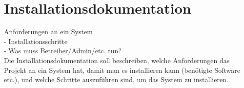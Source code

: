 
\chapter{Installationsdokumentation}

Anforderungen an ein System\\
- Installationsschritte\\
- Was muss Betreiber/Admin/etc. tun?\\

Die Installationsdokumentation soll beschreiben, welche Anforderungen das Projekt an ein System hat, damit man es installieren kann (benötigte Software etc.), und welche Schritte auszuführen sind, um das System zu installieren.

\newpage



\newpage



\newpage